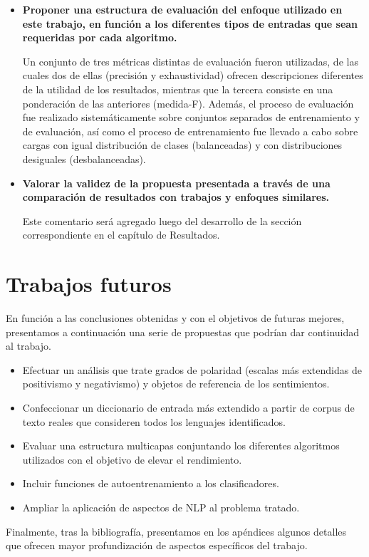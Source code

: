 \begin{itemize}
\item \textbf{Proponer una estructura de evaluaci\'on del enfoque utilizado en este trabajo, en funci\'on a los diferentes tipos de entradas que sean requeridas por cada algoritmo.}
\newline

Un conjunto de tres m\'etricas distintas de evaluaci\'on fueron utilizadas, de las cuales dos de ellas (precisi\'on y exhaustividad) ofrecen descripciones diferentes de la utilidad de los resultados, mientras que la tercera consiste en una ponderaci\'on de las anteriores (medida-F). Adem\'as, el proceso de evaluaci\'on fue realizado sistem\'aticamente sobre conjuntos separados de entrenamiento y de evaluaci\'on, as\'i como el proceso de entrenamiento fue llevado a cabo sobre cargas con igual distribuci\'on de clases (balanceadas) y con distribuciones desiguales (desbalanceadas).
\newline

\item \textbf{Valorar la validez de la propuesta presentada a trav\'es de una comparaci\'on de resultados con trabajos y enfoques similares.}
\newline

Este comentario ser\'a agregado luego del desarrollo de la secci\'on correspondiente en el cap\'itulo de Resultados.
\newline
\end{itemize}

\section{Trabajos futuros}

En funci\'on a las conclusiones obtenidas y con el objetivos de futuras mejores, presentamos a continuaci\'on una serie de propuestas que podr\'ian dar continuidad al trabajo.

\begin{itemize}
\item Efectuar un an\'alisis que trate grados de polaridad (escalas m\'as extendidas de positivismo y negativismo) y objetos de referencia de los sentimientos.
\item Confeccionar un diccionario de entrada m\'as extendido a partir de corpus de texto reales que consideren todos los lenguajes identificados.
\item Evaluar una estructura multicapas conjuntando los diferentes algoritmos utilizados con el objetivo de elevar el rendimiento.
\item Incluir funciones de autoentrenamiento a los clasificadores.
\item Ampliar la aplicaci\'on de aspectos de NLP al problema tratado.
\end{itemize}

Finalmente, tras la bibliograf\'ia, presentamos en los ap\'endices algunos detalles que ofrecen mayor profundizaci\'on de aspectos espec\'ificos del trabajo.